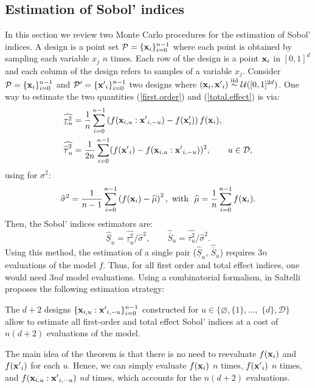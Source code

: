 \subsection{Estimation of Sobol' indices}
\label{sec:2.2}
In this section we review two Monte Carlo procedures for the estimation of Sobol' indices. A design is a point set $\mathcal{P}=\{\boldsymbol{\mathbf{x}}_i\}_{i=0}^{n-1}$ where each point is obtained by sampling each variable $x_j$ $n$ times. Each row of the design is a point $\boldsymbol{\mathbf{x}}_i$ in $[0,1]^d$ and each column of the design refers to samples of a variable $x_j$. Consider $\mathcal{P}=\{\boldsymbol{\mathbf{x}}_i\}_{i=0}^{n-1}$ and $\mathcal{P'}=\{{\boldsymbol{\mathbf{x}}'}_i\}_{i=0}^{n-1}$ two designs where $(\boldsymbol{\mathbf{x}}_i,{\boldsymbol{\mathbf{x}}'}_i) \stackrel{{\rm iid}}{\sim} \mathcal{U}([0,1]^{2d})$. One way to estimate the two quantities (\ref{first.order}) and (\ref{total.effect}) is via:
\begin{align}
\label{first.order.est}
\widehat{\underline{\tau}_u^2} &= \frac{1}{n} \sum \limits_{i=0}^{n-1} \left(f(\vx_{i,u}:{\vx'}_{i,-u})-f(\vx'_i)\right)f(\vx_i),\\
\label{total.effect.est}
\widehat{\ov{$\tau$}_u^2} &= \frac{1}{2n} \sum \limits_{i=0}^{n-1} (f({\vx'}_i) - f(\vx_{i,u}:{\vx'}_{i,-u}))^2, \qquad u \in \mathcal{D},
\end{align}
using for $\sigma^2$:
{\color{purple} 
\begin{equation}
 \widehat{\sigma}^2 = \frac{1}{n-1} \sum \limits_{i=0}^{n-1} \left( f(\boldsymbol{\mathbf{x}}_i) - \widehat{\mu}\right)^2, \text{ with } \ \widehat{\mu} =  \frac{1}{n} \sum \limits_{i=0}^{n-1} f(\boldsymbol{\mathbf{x}}_i).
\label{mu.est}
\end{equation}
}
Then, the Sobol' indices estimators are:
\begin{equation}
\widehat{\underline{S}}_u = \widehat{\underline{\tau}_u^2} / \widehat{\sigma}^2, \qquad
\widehat{\overline{S}}_u = \widehat{\overline{\tau}_u^2} / \widehat{\sigma}^2.
\label{common.sobol.est}
\end{equation}
Using this method, the estimation of a single pair ($\widehat{\underline{S}}_u$, $\widehat{\overline{S}}_u$) requires $3n$ evaluations of the model $f$. Thus, for all first order and total effect indices, one would need $3nd$ model evaluations. Using a combinatorial formalism, in \cite{Saltelli} Saltelli proposes the following estimation strategy:
\begin{theorem}
\label{saltelli.theorem}
The $d+2$ designs $\{\boldsymbol{\mathbf{x}}_{i,u}:{\boldsymbol{\mathbf{x}}'}_{i,-u}\}_{i=0}^{n-1}$ constructed for $u \in \{\varnothing,\{1\},\dots,$ $\{d\},\mathcal{D}\}$ allow to estimate all first-order and total effect Sobol' indices at a cost of $n(d+2)$ evaluations of the model.
\end{theorem}
The main idea of the theorem is that there is no need to reevaluate $f({\boldsymbol{\mathbf{x}}}_i)$ and $f({\boldsymbol{\mathbf{x}}'}_i)$ for each $u$. Hence, we can simply evaluate $f({\boldsymbol{\mathbf{x}}}_i)$ $n$ times, $f({\boldsymbol{\mathbf{x}}'}_i)$ $n$ times, and $f(\boldsymbol{\mathbf{x}}_{i,u}:{\boldsymbol{\mathbf{x}}'}_{i,-u})$ $nd$ times, which accounts for the $n(d+2)$ evaluations.

